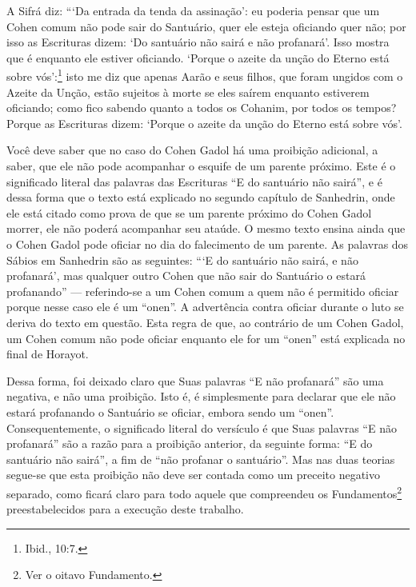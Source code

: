 A Sifrá diz: ```Da entrada da tenda da assinação': eu poderia pensar que
um Cohen comum não pode sair do Santuário, quer ele esteja oficiando
quer não; por isso as Escrituras dizem: `Do santuário não sairá e não
profanará'. Isso mostra que é enquanto ele estiver oficiando. `Porque o
azeite da unção do Eterno está sobre vós':\footnote{Ibid., 10:7.} isto me diz que
apenas Aarão e seus filhos, que foram ungidos com o Azeite da Unção,
estão sujeitos à morte se eles saírem enquanto estiverem oficiando; como
fico sabendo quanto a todos os Cohanim, por todos os tempos? Porque as
Escrituras dizem: `Porque o azeite da unção do Eterno está sobre
vós'.

Você deve saber que no caso do Cohen Gadol há uma proibição
adicional, a saber, que ele não pode acompanhar o esquife de um parente
próximo. Este é o significado literal das palavras das Escrituras ``E do
santuário não sairá'', e é dessa forma que o texto está explicado no
segundo capítulo de Sanhedrin, onde ele está citado como prova de que
se um parente próximo do Cohen Gadol morrer, ele não poderá
acompanhar seu ataúde. O mesmo texto ensina ainda que o Cohen Gadol
pode oficiar no dia do falecimento de um parente. As palavras dos Sábios
em Sanhedrin são as seguintes: ```E do santuário não sairá, e não
profanará', mas qualquer outro Cohen que não sair do Santuário o
estará profanando'' --- referindo-se a um Cohen comum a quem não é
permitido oficiar porque nesse caso ele é um ``onen''. A advertência
contra oficiar durante o luto se deriva do texto em questão. Esta regra
de que, ao contrário de um Cohen Gadol, um Cohen comum não pode
oficiar enquanto ele for um ``onen'' está explicada no final de
Horayot.

Dessa forma, foi deixado claro que Suas palavras ``E não profanará''
são uma negativa, e não uma proibição. Isto é, é simplesmente para
declarar que ele não estará profanando o Santuário se oficiar, embora sendo um
``onen''.
Consequentemente, o significado literal do versículo é que Suas palavras
``E não profanará'' são a razão para a proibição anterior, da seguinte
forma: ``E do santuário não sairá'', a fim de ``não profanar o santuário''.
Mas nas duas teorias segue-se que esta proibição não deve ser contada
como um preceito negativo separado, como ficará claro para todo aquele
que compreendeu os Fundamentos\footnote{Ver o oitavo Fundamento.} preestabelecidos
para a execução deste trabalho.

